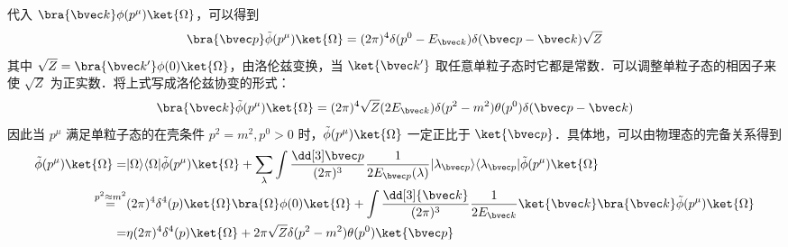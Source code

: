 代入 $\bra{\bvec k}\phi(p^\mu)\ket{\Omega}$，可以得到
\[
\bra{\bvec p}\tilde\phi(p^\mu)\ket{\Omega}=(2\pi)^4\delta(p^0-E_{\bvec k})\delta(\bvec p-\bvec k) \sqrt{Z}
\]
其中 $\sqrt{Z}=\bra{\bvec k'}\phi(0)\ket{\Omega}$，由洛伦兹变换，当 $\ket{\bvec k'}$ 取任意单粒子态时它都是常数．可以调整单粒子态的相因子来使 $\sqrt{Z}$ 为正实数．将上式写成洛伦兹协变的形式：
\[
\bra{\bvec k}\tilde\phi(p^\mu)\ket{\Omega}=(2\pi)^4 \sqrt{Z} (2E_{\bvec k})\delta(p^2-m^2)\theta(p^0) \delta(\bvec p-\bvec k)
\]
因此当 $p^\mu$ 满足单粒子态的在壳条件 $p^2=m^2,p^0>0$ 时，$\tilde \phi(p^\mu)\ket{\Omega}$ 一定正比于 $\ket{\bvec p}$．具体地，可以由物理态的完备关系得到
\begin{equation}\begin{aligned}
\tilde \phi(p^\mu)\ket{\Omega}=&|\Omega\rangle \langle \Omega|\tilde \phi(p^\mu)\ket{\Omega} + \sum_{\lambda}\int \frac{\dd[3] \bvec p}{(2\pi)^3}\frac{1}{2E_{\bvec p}(\lambda)}|\lambda_{\bvec p}\rangle \langle \lambda_{\bvec p}|\tilde \phi(p^\mu)\ket{\Omega}\\ \overset{p^2\approx m^2}{=}&(2\pi)^4 \delta^4(p)\ket{\Omega}\bra{\Omega}\phi(0)\ket{\Omega}
+
\int \frac{\dd[3]{\bvec k}}{(2\pi)^3}\frac{1}{2 E_{\bvec k}} \ket{\bvec k}\bra{\bvec k}\tilde \phi(p^\mu)\ket{\Omega}\\
=&\eta(2\pi)^4\delta^4(p)\ket{\Omega}+2\pi \sqrt{Z} \delta(p^2-m^2)\theta(p^0) \ket{\bvec p}
\end{aligned}\end{equation}

